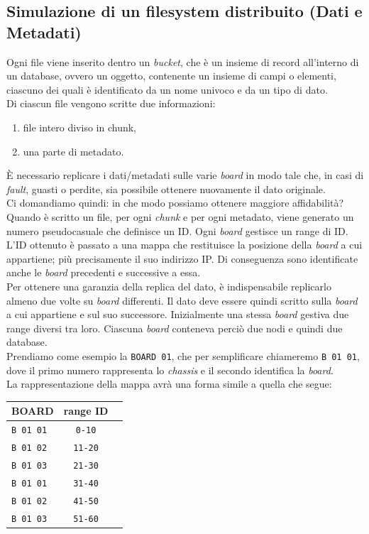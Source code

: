 \subsection{Simulazione di un filesystem distribuito (Dati e Metadati)}
Ogni file viene inserito dentro un \textit{bucket}, che \`{e} un insieme di record all'interno di un database, ovvero un oggetto, contenente un insieme di campi o elementi, ciascuno dei quali \`{e} identificato da un nome univoco e da un tipo di dato.\\
Di ciascun file vengono scritte due informazioni:
\begin{enumerate}
\item 
file intero diviso in chunk,
\item
una parte di metadato.\\
\end{enumerate}
\`{E} necessario replicare i dati/metadati sulle varie \textit{board} in modo tale che, in casi di \textit{fault}, guasti o perdite, sia possibile ottenere nuovamente il dato originale.\\
Ci domandiamo quindi: in che modo possiamo ottenere maggiore affidabilit\`{a}?
Quando \`{e} scritto un file, per ogni \textit{chunk} e per ogni metadato, viene generato un numero pseudocasuale che definisce un ID. 
Ogni \textit{board} gestisce un range di ID.
L'ID ottenuto \`{e} passato a una mappa che restituisce la posizione della \textit{board} a cui appartiene; pi\`{u} precisamente il suo indirizzo IP. Di conseguenza sono identificate anche le \textit{board} precedenti e successive a essa.\\
Per ottenere una garanzia della replica del dato, \`{e} indispensabile replicarlo almeno due volte su \textit{board} differenti. Il dato deve essere quindi scritto sulla \textit{board} a cui appartiene e sul suo successore.
Inizialmente una stessa \textit{board} gestiva due range diversi tra loro. Ciascuna \textit{board} conteneva perci\`{o} due nodi e quindi due database.\\
Prendiamo come esempio la \verb"BOARD 01", che per semplificare chiameremo \verb"B 01 01", dove il primo numero rappresenta lo \textit{chassis} e il secondo identifica la \textit{board}.\\
La rappresentazione della mappa avr\`{a} una forma simile a quella che segue:\\
\begin{center}
\begin{tabular}{ | l | c | r}
\hline
\textbf{BOARD} & \textbf{range ID}\\
\hline
\verb"B 01 01" & \verb"0-10"\\
\verb"B 01 02" & \verb"11-20"\\
\verb"B 01 03" & \verb"21-30"\\
\verb"B 01 01" & \verb"31-40"\\
\verb"B 01 02" & \verb"41-50"\\
\verb"B 01 03" & \verb"51-60"\\
\hline

\end{tabular}
\end{center}
\\

